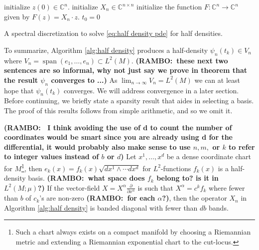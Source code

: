 \documentclass[final,leqno]{siamltex1213}
\newcommand{\ram}[1]{{\normalsize{\textbf{({\color{red}RAMBO:\ }#1)}}}}
\newcommand{\pder}[2]{\ensuremath{\frac{ \partial #1}{\partial #2}}}
\begin{document}
\begin{algorithm}
	initialize $z(0) \in \mathbb{C}^{n}$.\;
	initialize $X_{n} \in \mathbb{C}^{n \times n}$\;
	initialize the function $F: \mathbb{C}^{n} \to \mathbb{C}^{n}$ given by $F(z) = X_{n} \cdot z$.\;
	$t_{0} = 0$\;
	\caption{A spectral discretization to solve \eqref{eq:half density pde} for half densities.} \label{alg:half density}
\end{algorithm}

To summarize, Algorithm \ref{alg:half density} produces a half-density $\psi_{n}(t_{k}) \in V_{n}$ where $V_{n} = \operatorname{span}( e_{1},\dots,e_{n}) \subset L^{2}(M)$.
\ram{these next two sentences are so informal, why not just say we prove in theorem \cite{} that the result $\psi_n$ converges to ...}
As $\lim_{n\to \infty} V_{n} = L^{2}(M)$ we can at least hope that $\psi_{n}(t_{k})$ converges.
We will address convergence in a later section.
Before continuing, we briefly state a sparsity result that aides in selecting a basis.
The proof of this results follows from simple arithmetic, and so we omit it.

\begin{theorem} \label{thm:sparsity}
\ram{ I think avoiding the use of d to count the number of coordinates would be smart since you are already using d for the differential, it would probably also make sense to use $n,m,$ or $k$ to refer to integer values instead of $b$ or $d$}
	Let $x^{1},\dots,x^{d}$ be a dense coordinate chart for $M$\footnote{Such a chart always exists on a compact manifold by choosing a Riemannian metric and extending a Riemannian exponential chart to the cut-locus.\cite{Sakai1996,MO_dense_charts} },
	then $e_{k} (x)= f_{k}(x) \sqrt{dx^{1} \wedge \cdots dx^{d}}$ for $L^{2}$-functions $f_{k}(x)$ is a half-density basis. \ram{what space does $f_k$ belong to? is it in $L^2(M;\mu)$?}
	If the vector-field $X = X^{\alpha} \pder{}{x^{\alpha}}$ is such that $X^{\alpha} = c^{k} f_{k}$ where fewer than $b$ of $c_{k}$'s are non-zero \ram{for each $\alpha$?}, then the operator $X_{n}$ in Algorithm \ref{alg:half density} is banded diagonal with fewer than $db$ bands.
\end{theorem}
\end{document}
